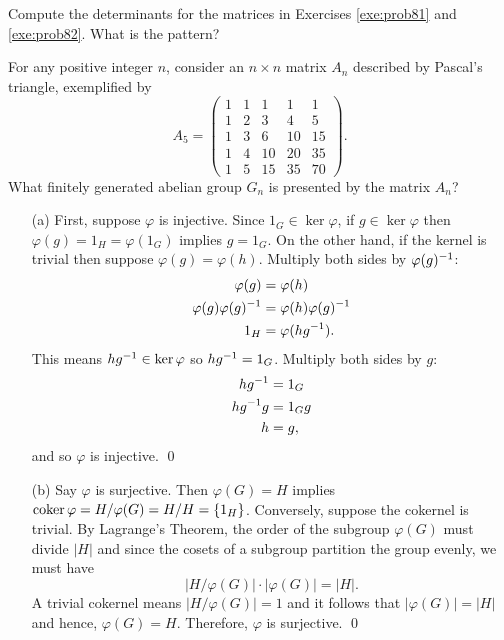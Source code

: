 \documentclass[../algebraNotesMSRI-UP2016.tex]{subfiles}
\begin{document}
\begin{frame}[c]
\begin{que}
Compute the determinants for the matrices in Exercises \ref{exe:prob81} and \ref{exe:prob82}.  What is the pattern?
\end{que}
\end{frame}

\begin{frame}
\begin{exe}[cf. Problem 83]\label{exe:prob83}
For any positive integer $n$, consider an $n\times n$ matrix $A_n$ described by Pascal's triangle, exemplified by 
\[
A_5=
\begin{pmatrix}
1 & 1 & 1 & 1 & 1 \\
1 & 2 & 3 & 4 & 5 \\
1 & 3 & 6 & 10 & 15 \\
1 & 4 & 10 & 20 & 35 \\
1 & 5 & 15 & 35 & 70
\end{pmatrix}.
\]
What finitely generated abelian group $G_n$ is presented by the matrix $A_n$?
\end{exe}
\end{frame}

\answerKey
\begin{frame}{\subsecname}
\begin{itemize}
\item[(a)] First, suppose $\varphi$ is injective.  Since $1_G\in \ker\varphi$, if $g\in \ker\varphi$ then $\varphi(g)=1_H=\varphi(1_G)$ implies $g=1_G$.  On the other hand, if the kernel is trivial then suppose $\varphi(g)=\varphi(h)$.  Multiply both sides by $\varphi(g)^{-1}$:
\begin{align*}
\varphi(g) &= \varphi(h) \\
\varphi(g)\varphi(g)^{-1} &= \varphi(h)\varphi(g)^{-1} \\
1_H &= \varphi(hg^{-1}).
\end{align*}
This means $hg^{-1} \in\ker\varphi$ so $hg^{-1}=1_G$.  Multiply both sides by $g$:
\begin{align*}
hg^{-1} &= 1_G \\
hg^{-1}g &= 1_Gg \\
h &= g, 
\end{align*}
and so $\varphi$ is injective.
\qed 
\end{itemize}
\end{frame}

\begin{frame}[c]
\begin{itemize}
\item[(b)] Say $\varphi$ is surjective.  Then $\varphi(G)=H$ implies $\operatorname{coker}\varphi=H/\varphi(G)=H/H=\{1_H\}$.  Conversely, suppose the cokernel is trivial.  By Lagrange's Theorem, the order of the subgroup $\varphi(G)$ must divide $|H|$ and since the cosets of a subgroup partition the group evenly, we must have 
\[
|H/\varphi(G)|\cdot |\varphi(G)|=|H|.
\]
A trivial cokernel means $|H/\varphi(G)|=1$ and it follows that $|\varphi(G)|=|H|$ and hence, $\varphi(G)=H$.  Therefore, $\varphi$ is surjective.
\qed
\end{itemize}
\end{frame}
\end{document}
